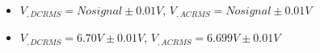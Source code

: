 \begin{itemize}
     \item $V_{, DCRMS}=No signal\pm 0.01\unit{V}$, $V_{, ACRMS}=No signal\pm 0.01\unit{V}$ 
     \item $V_{, DCRMS}=6.70V\pm 0.01\unit{V}$, $V_{, ACRMS}=6.699V\pm 0.01\unit{V}$\\
\end{itemize}
